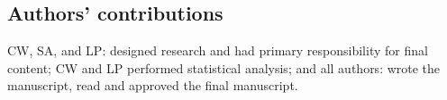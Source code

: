 \documentclass{bmcart}
\begin{document}
\begin{backmatter}

\section*{Authors' contributions}
CW, SA, and LP: designed research and had primary responsibility for final content; CW and LP performed statistical analysis; and all authors: wrote the manuscript, read and approved the final manuscript.







\end{backmatter}
\end{document}
